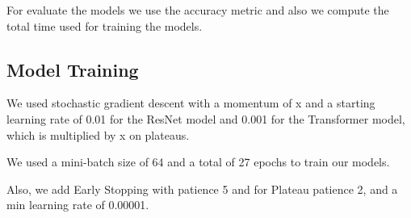 For evaluate the models we use the accuracy metric and also we compute the total time used for training the models.

\subsection{Model Training}

We used stochastic gradient descent with a momentum of x and a starting learning rate of 0.01 for the ResNet model and 0.001 for the Transformer model, which is multiplied by x on plateaus. 

We used a mini-batch size of 64 and a total of 27 epochs to train our models.

Also, we add Early Stopping with patience 5 and for Plateau patience 2, and a min learning rate of 0.00001.